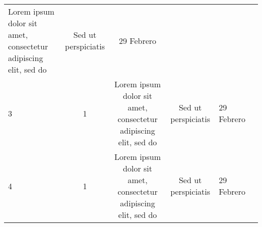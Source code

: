 \documentclass[]{book}
\begin{document}
\begin{longtable}[]{@{}lcccll@{}}
\begin{minipage}[t]{0.27\columnwidth}
Lorem ipsum dolor sit amet, consectetur adipiscing elit, sed do\strut
\end{minipage} & \begin{minipage}[t]{0.09\columnwidth}\centering\strut
Sed ut perspiciatis\strut
\end{minipage} & \begin{minipage}[t]{0.08\columnwidth}\raggedright\strut
29 Febrero\strut
\end{minipage} & \begin{minipage}[t]{0.22\columnwidth}\raggedright\strut
\strut
\end{minipage}\tabularnewline
\begin{minipage}[t]{0.02\columnwidth}\raggedright\strut
3\strut
\end{minipage} & \begin{minipage}[t]{0.16\columnwidth}\centering\strut
1\strut
\end{minipage} & \begin{minipage}[t]{0.27\columnwidth}\centering\strut
Lorem ipsum dolor sit amet, consectetur adipiscing elit, sed do\strut
\end{minipage} & \begin{minipage}[t]{0.09\columnwidth}\centering\strut
Sed ut perspiciatis\strut
\end{minipage} & \begin{minipage}[t]{0.08\columnwidth}\raggedright\strut
29 Febrero\strut
\end{minipage} & \begin{minipage}[t]{0.22\columnwidth}\raggedright\strut
\strut
\end{minipage}\tabularnewline
\begin{minipage}[t]{0.02\columnwidth}\raggedright\strut
4\strut
\end{minipage} & \begin{minipage}[t]{0.16\columnwidth}\centering\strut
1\strut
\end{minipage} & \begin{minipage}[t]{0.27\columnwidth}\centering\strut
Lorem ipsum dolor sit amet, consectetur adipiscing elit, sed do\strut
\end{minipage} & \begin{minipage}[t]{0.09\columnwidth}\centering\strut
Sed ut perspiciatis\strut
\end{minipage} & \begin{minipage}[t]{0.08\columnwidth}\raggedright\strut
29 Febrero\strut
\end{minipage} & \begin{minipage}[t]{0.22\columnwidth}\raggedright\strut

\end{minipage}
\end{longtable}
\end{document}
